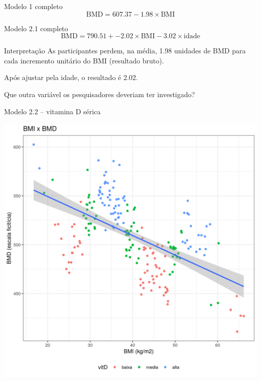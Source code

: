 \documentclass{beamer}
\begin{document}
\begin{frame}{\scriptsize }
  \begin{exampleblock}{Modelo 1 completo}
    \tiny
    \begin{displaymath}
      \text{BMD} =607.37 -1.98 \times\text{BMI}
    \end{displaymath}
  \end{exampleblock}
  \begin{exampleblock}{Modelo 2.1 completo}
    \footnotesize
    \begin{displaymath}
      \text{BMD} =790.51 + -2.02 \times\text{BMI} -3.02 \times\text{idade}
    \end{displaymath}
  \end{exampleblock}
  \begin{exampleblock}{Interpretação}
    \footnotesize
    As participantes perdem, na média, 1.98 unidades de BMD para cada incremento unitário do BMI (resultado bruto).

    \bigskip
    Após ajustar pela idade, o resultado é 2.02.
  \end{exampleblock}
\end{frame}

\begin{frame}{\scriptsize }
  \begin{center}
    Que outra variável os pesquisadores deveriam ter investigado?
  \end{center}
\end{frame}

\begin{frame}{\scriptsize Modelo 2.2 -- vitamina D sérica}
  \begin{center}
    \includegraphics[height=.9\textheight]{Cap31-32/pratica-rlm2_2}
  \end{center}
\end{frame}
\end{document}
